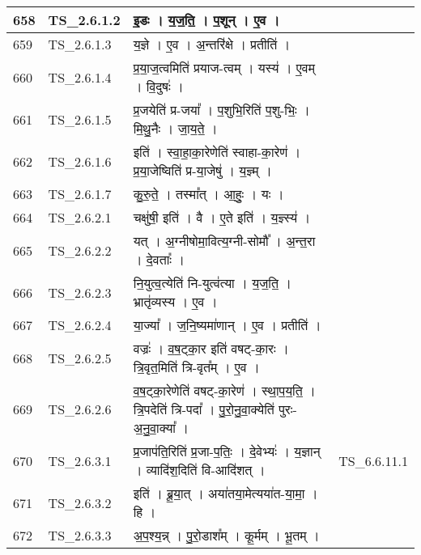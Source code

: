 \documentclass[17pt]{extarticle}
\begin{document}
\begin{longtable}{||p{0.4in}||p{0.9in}||p{4.0in}||p{0.9in}||}
        \hline
            658 & TS\_2.6.1.2 & इ॒डः   ।   य॒ज॒ति॒   ।   प॒शून्   ।   ए॒व   ।    &      \\
        \hline
            659 & TS\_2.6.1.3 & य॒ज्ञे   ।   ए॒व   ।   अ॒न्तरि॑क्षे   ।   प्रतीति॑   ।    &      \\
        \hline
            660 & TS\_2.6.1.4 & प्र॒या॒ज॒त्वमिति॑ प्रयाज{-}त्वम्   ।   यस्य॑   ।   ए॒वम्   ।   वि॒दुषः॑   ।    &      \\
        \hline
            661 & TS\_2.6.1.5 & प्र॒जयेति॑ प्र{-}जया᳚   ।   प॒शुभि॒रिति॑ प॒शु{-}भिः॒   ।   मि॒थु॒नैः   ।   जा॒य॒ते॒   ।    &      \\
        \hline
            662 & TS\_2.6.1.6 & इति॑   ।   स्वा॒हा॒का॒रेणेति॑ स्वाहा{-}का॒रेण॑   ।   प्र॒या॒जेष्विति॑ प्र{-}या॒जेषु॑   ।   य॒ज्ञ्म्   ।    &      \\
        \hline
            663 & TS\_2.6.1.7 & कु॒रु॒ते॒   ।   तस्मा᳚त्   ।   आ॒हुः॒   ।   यः   ।    &      \\
        \hline
            664 & TS\_2.6.2.1 & चक्षु॑षी॒ इति॑   ।   वै   ।   ए॒ते इति॑   ।   य॒ज्ञ्स्य॑   ।    &      \\
        \hline
            665 & TS\_2.6.2.2 & यत्   ।   अ॒ग्नीषोमा॒वित्य॒ग्नी{-}सोमौ᳚   ।   अ॒न्त॒रा   ।   दे॒वताः᳚   ।    &      \\
        \hline
            666 & TS\_2.6.2.3 & नि॒युत्व॒त्येति॑ नि{-}युत्व॑त्या   ।   य॒ज॒ति॒   ।   भ्रातृ॑व्यस्य   ।   ए॒व   ।    &      \\
        \hline
            667 & TS\_2.6.2.4 & या॒ज्या᳚   ।   ज॒नि॒ष्यमा॑णान्   ।   ए॒व   ।   प्रतीति॑   ।    &      \\
        \hline
            668 & TS\_2.6.2.5 & वज्रः॑   ।   व॒ष॒ट्का॒र इति॑ वषट्{-}का॒रः   ।   त्रि॒वृत॒मिति॑ त्रि{-}वृत᳚म्   ।   ए॒व   ।    &      \\
        \hline
            669 & TS\_2.6.2.6 & व॒ष॒ट्का॒रेणेति॑ वषट्{-}का॒रेण॑   ।   स्था॒प॒य॒ति॒   ।   त्रि॒पदेति॑ त्रि{-}पदा᳚   ।   पु॒रो॒नु॒वा॒क्येति॑ पुरः{-}अ॒नु॒वा॒क्या᳚   ।    &      \\
        \hline
            670 & TS\_2.6.3.1 & प्र॒जाप॑ति॒रिति॑ प्र॒जा{-}प॒तिः॒   ।   दे॒वेभ्यः॑   ।   य॒ज्ञान्   ।   व्यादि॑श॒दिति॑ वि{-}आदि॑शत्   ।    &  TS\_6.6.11.1       \\
        \hline
            671 & TS\_2.6.3.2 & इति॑   ।   ब्रू॒या॒त्   ।   अया॑तया॒मेत्यया॑त{-}या॒मा॒   ।   हि   ।    &      \\
        \hline
            672 & TS\_2.6.3.3 & अ॒प॒श्य॒न्न्   ।   पु॒रो॒डाश᳚म्   ।   कू॒र्मम्   ।   भू॒तम्   ।    &      \\

\end{longtable}
\end{document}
